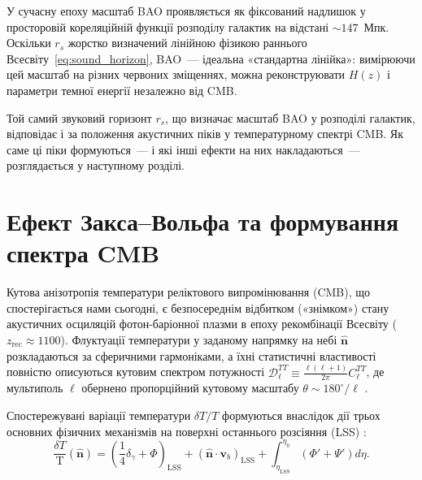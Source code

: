 \documentclass[12pt, a4paper]{article}
\begin{document}
У сучасну епоху масштаб BAO проявляється як фіксований
надлишок у просторовій кореляційній функції розподілу
галактик на відстані $\sim 147$~Мпк. Оскільки $r_s$
жорстко визначений лінійною фізикою раннього
Всесвіту~\eqref{eq:sound_horizon}, BAO~--- ідеальна
«стандартна лінійка»: вимірюючи цей масштаб на різних
червоних зміщеннях, можна реконструювати $H(z)$ і
параметри темної енергії незалежно від CMB.

Той самий звуковий горизонт $r_s$, що визначає масштаб
BAO у розподілі галактик, відповідає і за положення
акустичних піків у температурному спектрі CMB. Як саме
ці піки формуються~--- і які інші ефекти на них
накладаються~--- розглядається у наступному розділі.


\section{Ефект Закса--Вольфа та формування спектра CMB}
\label{sec:sachs}

Кутова анізотропія температури реліктового випромінювання (CMB), що спостерігається нами сьогодні, є безпосереднім відбитком («знімком») стану акустичних осциляцій фотон-баріонної плазми в епоху рекомбінації Всесвіту ($z_{\mathrm{rec}} \approx 1100$). Флуктуації температури у заданому напрямку на небі $\hat{\mathbf{n}}$ розкладаються за сферичними гармоніками, а їхні статистичні властивості повністю описуються кутовим спектром потужності $\mathcal{D}_\ell^{TT} \equiv \frac{\ell(\ell+1)}{2\pi}C_\ell^{TT}$, де мультиполь $\ell$ обернено пропорційний кутовому масштабу $\theta \sim 180^\circ / \ell$ \cite{dodelson_2020}.

Спостережувані варіації температури $\delta T / T$ формуються внаслідок дії трьох основних фізичних механізмів на поверхні останнього розсіяння (LSS) \cite{hu_sugiyama_1995}:
\begin{equation}\label{eq:cmb_sources}
  \frac{\delta T}{\text{T}}(\hat{\mathbf{n}}) = \left( \frac{1}{4}\delta_\gamma + \Phi \right)_{\mathrm{LSS}} + \left( \hat{\mathbf{n}} \cdot \mathbf{v}_b \right)_{\mathrm{LSS}} + \int_{\eta_{\mathrm{LSS}}}^{\eta_0} \left( \Phi' + \Psi' \right) d\eta.
\end{equation}
\end{document}
